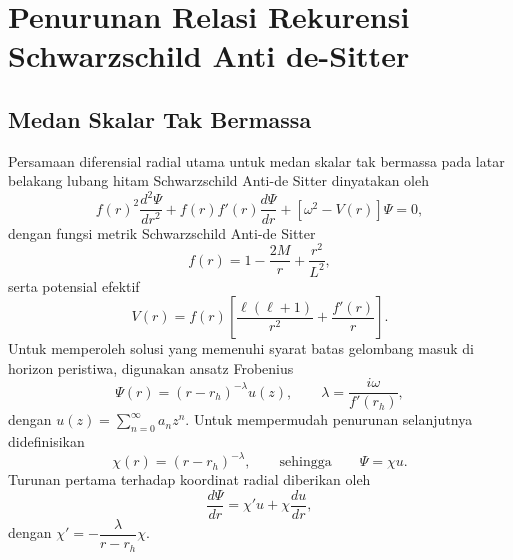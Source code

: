 \chapter{Penurunan Relasi Rekurensi Schwarzschild Anti de-Sitter}
\label{app:rekuren-sads}

\section{Medan Skalar Tak Bermassa}

Persamaan diferensial radial utama untuk medan skalar tak bermassa pada latar belakang lubang hitam Schwarzschild Anti-de Sitter dinyatakan oleh
\begin{equation} f(r)^2\frac{d^2\Psi}{dr^2} + f(r)f'(r)\frac{d\Psi}{dr} + \left[\omega^2 - V(r)\right]\Psi = 0, \end{equation}
dengan fungsi metrik Schwarzschild Anti-de Sitter
\begin{equation} f(r) = 1 - \frac{2M}{r} + \frac{r^2}{L^2}, \end{equation}
serta potensial efektif
\begin{equation} V(r) = f(r)\left[\frac{\ell(\ell+1)}{r^2} + \frac{f'(r)}{r}\right]. \end{equation}
Untuk memperoleh solusi yang memenuhi syarat batas gelombang masuk di horizon peristiwa, digunakan ansatz Frobenius
\begin{equation} \Psi(r) = (r-r_h)^{-\lambda}u(z), \qquad \lambda = \frac{i\omega}{f'(r_h)}, \end{equation}
dengan $u(z) = \sum_{n=0}^{\infty}a_nz^n$. Untuk mempermudah penurunan selanjutnya didefinisikan
\begin{equation} \chi(r) = (r-r_h)^{-\lambda}, \qquad \text{sehingga} \qquad \Psi = \chi u. \end{equation}
Turunan pertama terhadap koordinat radial diberikan oleh
\begin{equation} \frac{d\Psi}{dr} = \chi'u + \chi\frac{du}{dr}, \end{equation}
dengan $\chi' = -\dfrac{\lambda}{r-r_h}\chi$.


